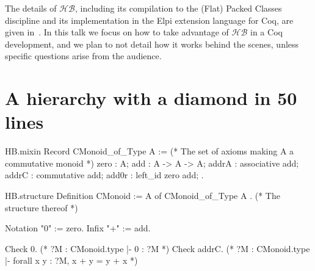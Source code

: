 \documentclass{easychair}
\newcommand{\HB}{\ensuremath{\mathcal{HB}}}
\begin{document}
The details of \HB{}, including its compilation to the (Flat) Packed Classes
discipline and its implementation in the Elpi extension language for Coq,
are given in~\cite{cohen:hal-02478907}.
In this talk we focus on how to take advantage
of \HB{} in a Coq development, and we plan to not detail how it works
behind the scenes, unless specific questions arise from the audience.

\section{A hierarchy with a diamond in 50 lines}

\begin{coqcode}
HB.mixin Record CMonoid_of_Type A := { (* The set of axioms making A a commutative monoid *)
  zero : A;
  add : A -> A -> A;
  addrA : associative add;
  addrC : commutative add;
  add0r : left_id zero add;
}.

HB.structure Definition CMonoid := { A of CMonoid_of_Type A }. (* The structure thereof *)

Notation "0" := zero.
Infix "+" := add.

Check 0.     (* ?M : CMonoid.type |- 0 : ?M *)
Check addrC. (* ?M : CMonoid.type |- forall x y : ?M, x + y = y + x *)
\end{coqcode}

\newpage
\end{document}
